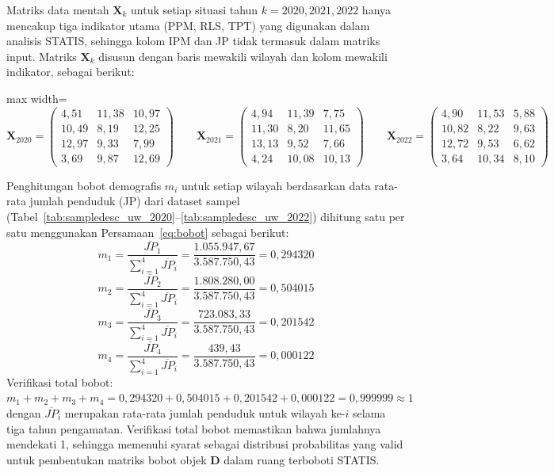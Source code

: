 

{\captionsetup[table]{list=no}}

{\captionsetup[table]{list=no}}

Matriks data mentah $\mathbf{X}_k$ untuk setiap situasi tahun $k = 2020, 2021, 2022$ hanya mencakup tiga indikator utama (PPM, RLS, TPT) yang digunakan dalam analisis STATIS, sehingga kolom IPM dan JP tidak termasuk dalam matriks input. Matriks $\mathbf{X}_k$ disusun dengan baris mewakili wilayah dan kolom mewakili indikator, sebagai berikut:
\begin{center}
\begin{adjustbox}{max width=\textwidth}
$\displaystyle
\mathbf{X}_{2020} = \begin{pmatrix}
4,51 & 11,38 & 10,97 \\
10,49 & 8,19 & 12,25 \\
12,97 & 9,33 & 7,99 \\
3,69 & 9,87 & 12,69
\end{pmatrix}
\qquad
\mathbf{X}_{2021} = \begin{pmatrix}
4,94 & 11,39 & 7,75 \\
11,30 & 8,20 & 11,65 \\
13,13 & 9,52 & 7,66 \\
4,24 & 10,08 & 10,13
\end{pmatrix}
\qquad
\mathbf{X}_{2022} = \begin{pmatrix}
4,90 & 11,53 & 5,88 \\
10,82 & 8,22 & 9,63 \\
12,72 & 9,53 & 6,62 \\
3,64 & 10,34 & 8,10
\end{pmatrix}
$
\end{adjustbox}
\end{center}

Penghitungan bobot demografis $m_i$ untuk setiap wilayah berdasarkan data rata-rata jumlah penduduk (JP) dari dataset sampel (Tabel~\ref{tab:sampledesc_uw_2020}--\ref{tab:sampledesc_uw_2022}) dihitung satu per satu menggunakan Persamaan~\ref{eq:bobot} sebagai berikut:
\[ m_1 = \frac{\overline{JP}_1}{\sum_{i=1}^4 \overline{JP}_i} = \frac{1.055.947,67}{3.587.750,43} = 0{,}294320 \]
\[ m_2 = \frac{\overline{JP}_2}{\sum_{i=1}^4 \overline{JP}_i} = \frac{1.808.280,00}{3.587.750,43} = 0{,}504015 \]
\[ m_3 = \frac{\overline{JP}_3}{\sum_{i=1}^4 \overline{JP}_i} = \frac{723.083,33}{3.587.750,43} = 0{,}201542 \]
\[ m_4 = \frac{\overline{JP}_4}{\sum_{i=1}^4 \overline{JP}_i} = \frac{439,43}{3.587.750,43} = 0{,}000122 \]
Verifikasi total bobot: $m_1 + m_2 + m_3 + m_4 = 0{,}294320 + 0{,}504015 + 0{,}201542 + 0{,}000122 = 0{,}999999 \approx 1$ dengan $\overline{JP}_i$ merupakan rata-rata jumlah penduduk untuk wilayah ke-$i$ selama tiga tahun pengamatan. Verifikasi total bobot memastikan bahwa jumlahnya mendekati 1, sehingga memenuhi syarat sebagai distribusi probabilitas yang valid untuk pembentukan matriks bobot objek $\mathbf{D}$ dalam ruang terboboti STATIS.

